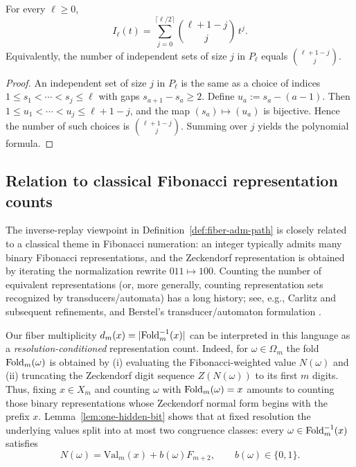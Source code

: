 \begin{theorem}\label{thm:path-indset-poly-closed}
For every $\ell\ge 0$,
\[
I_\ell(t)=\sum_{j=0}^{\lceil \ell/2\rceil}\binom{\ell+1-j}{j}\,t^j.
\]
Equivalently, the number of independent sets of size $j$ in $P_\ell$ equals $\binom{\ell+1-j}{j}$.
\end{theorem}
\begin{proof}
An independent set of size $j$ in $P_\ell$ is the same as a choice of indices
\(
1\le s_1<\cdots<s_j\le \ell
\)
with gaps $s_{a+1}-s_a\ge 2$.
Define $u_a:=s_a-(a-1)$.
Then $1\le u_1<\cdots<u_j\le \ell+1-j$, and the map $(s_a)\mapsto (u_a)$ is bijective.
Hence the number of such choices is $\binom{\ell+1-j}{j}$.
Summing over $j$ yields the polynomial formula.
\end{proof}

\subsection{Relation to classical Fibonacci representation counts}\label{app:fiber-related-work}
The inverse-replay viewpoint in Definition~\ref{def:fiber-adm-path} is closely related to a classical theme in Fibonacci numeration:
an integer typically admits many binary Fibonacci representations, and the Zeckendorf representation is obtained by iterating the normalization rewrite $011\mapsto 100$.
Counting the number of equivalent representations (or, more generally, counting representation sets recognized by transducers/automata) has a long history; see, e.g., Carlitz and subsequent refinements, and Berstel's transducer/automaton formulation \cite{Carlitz1968FibonacciRepresentations,ITA_2001__35_6_491_0}.

Our fiber multiplicity $d_m(x)=|\mathrm{Fold}_m^{-1}(x)|$ can be interpreted in this language as a \emph{resolution-conditioned} representation count.
Indeed, for $\omega\in\Omega_m$ the fold $\mathrm{Fold}_m(\omega)$ is obtained by (i) evaluating the Fibonacci-weighted value $N(\omega)$ and (ii) truncating the Zeckendorf digit sequence $Z(N(\omega))$ to its first $m$ digits.
Thus, fixing $x\in X_m$ and counting $\omega$ with $\mathrm{Fold}_m(\omega)=x$ amounts to counting those binary representations whose Zeckendorf normal form begins with the prefix $x$.
Lemma~\ref{lem:one-hidden-bit} shows that at fixed resolution the underlying values split into at most two congruence classes:
every $\omega\in\mathrm{Fold}_m^{-1}(x)$ satisfies
\[
N(\omega)=\mathrm{Val}_m(x)+b(\omega)F_{m+2},\qquad b(\omega)\in\{0,1\}.
\]

